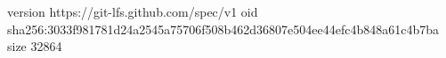 version https://git-lfs.github.com/spec/v1
oid sha256:3033f981781d24a2545a75706f508b462d36807e504ee44efc4b848a61c4b7ba
size 32864
